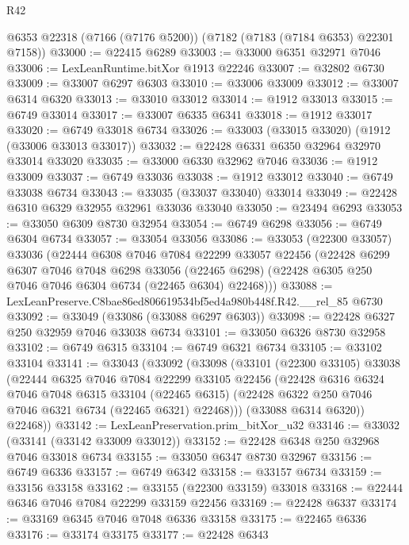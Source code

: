\begin{lexlean}{R42}
\begin{coremodule}
{    @6353
    @22318
    (@7166 (@7176 @5200))
    (@7182 (@7183 (@7184 @6353) @22301 @7158))
@33000 := @22415 @6289
@33003 := @33000 @6351 @32971 @7046
@33006 := LexLeanRuntime.bitXor @1913 @22246
@33007 := @32802 @6730
@33009 := @33007 @6297 @6303
@33010 := @33006 @33009
@33012 := @33007 @6314 @6320
@33013 := @33010 @33012
@33014 := @1912 @33013
@33015 := @6749 @33014
@33017 := @33007 @6335 @6341
@33018 := @1912 @33017
@33020 := @6749 @33018 @6734
@33026 := @33003 (@33015 @33020) (@1912 (@33006 @33013 @33017))
@33032 := @22428 @6331 @6350 @32964 @32970 @33014 @33020
@33035 := @33000 @6330 @32962 @7046
@33036 := @1912 @33009
@33037 := @6749 @33036
@33038 := @1912 @33012
@33040 := @6749 @33038 @6734
@33043 := @33035 (@33037 @33040) @33014
@33049 := @22428 @6310 @6329 @32955 @32961 @33036 @33040
@33050 := @23494 @6293
@33053 := @33050 @6309 @8730 @32954
@33054 := @6749 @6298
@33056 := @6749 @6304 @6734
@33057 := @33054 @33056
@33086 := @33053
    (@22300 @33057)
    @33036
    (@22444
      @6308
      @7046
      @7084
      @22299
      @33057
      @22456
      (@22428
        @6299
        @6307
        @7046
        @7048
        @6298
        @33056
        (@22465 @6298)
        (@22428 @6305 @250 @7046 @7046 @6304 @6734 (@22465 @6304) @22468)))
@33088 := LexLeanPreserve.C8bae86ed806619534bf5ed4a980b448f.R42.__rel_85 @6730
@33092 := @33049 (@33086 (@33088 @6297 @6303))
@33098 := @22428 @6327 @250 @32959 @7046 @33038 @6734
@33101 := @33050 @6326 @8730 @32958
@33102 := @6749 @6315
@33104 := @6749 @6321 @6734
@33105 := @33102 @33104
@33141 := @33043
    (@33092
      (@33098
        (@33101
          (@22300 @33105)
          @33038
          (@22444
            @6325
            @7046
            @7084
            @22299
            @33105
            @22456
            (@22428
              @6316
              @6324
              @7046
              @7048
              @6315
              @33104
              (@22465 @6315)
              (@22428 @6322 @250 @7046 @7046 @6321 @6734 (@22465 @6321) @22468)))
          (@33088 @6314 @6320))
        @22468))
@33142 := LexLeanPreservation.prim_bitXor_u32
@33146 := @33032 (@33141 (@33142 @33009 @33012))
@33152 := @22428 @6348 @250 @32968 @7046 @33018 @6734
@33155 := @33050 @6347 @8730 @32967
@33156 := @6749 @6336
@33157 := @6749 @6342
@33158 := @33157 @6734
@33159 := @33156 @33158
@33162 := @33155 (@22300 @33159) @33018
@33168 := @22444 @6346 @7046 @7084 @22299 @33159 @22456
@33169 := @22428 @6337
@33174 := @33169 @6345 @7046 @7048 @6336 @33158
@33175 := @22465 @6336
@33176 := @33174 @33175
@33177 := @22428 @6343
}
\end{coremodule}
\end{lexlean}
